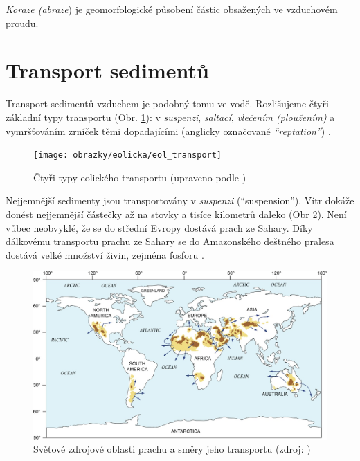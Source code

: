 \emph{Koraze (abraze}) je geomorfologické působení částic obsažených ve vzduchovém proudu.

\section{Transport sedimentů}
Transport sedimentů vzduchem je podobný tomu ve vodě. Rozlišujeme čtyři základní typy transportu (Obr. \ref{fig:eoltransport}): v \emph{suspenzi}, \emph{saltací}, \emph{vlečením (ploužením)} a vymršťováním zrníček těmi dopadajícími (anglicky označované \emph{\enquote{reptation}}) \parencite{livingstoneAeolianGeomorphologyNew2019}. 

\begin{figure}
	\centering
	\texttt{[image: obrazky/eolicka/eol\_transport]}
	\caption{Čtyři typy eolického transportu (upraveno podle \textcite{livingstoneAeolianGeomorphologyNew2019})}
	\label{fig:eoltransport}
\end{figure}


Nejjemnější sedimenty jsou transportovány v \emph{suspenzi} (\enquote{suspension}). Vítr dokáže donést nejjemnější částečky až na stovky a tisíce kilometrů daleko (Obr \ref{fig:zdrojprachu}). Není vůbec neobvyklé, že se do střední Evropy dostává prach ze Sahary. Díky dálkovému transportu prachu ze Sahary se do Amazonského deštného pralesa dostává velké množství živin, zejména fosforu \parencite{prosperoCharacterizingQuantifyingAfrican2020}.

\begin{figure}
	\centering
	\includegraphics[width=1\linewidth]{obrazky/eolicka/zdroje_prachu}
	\caption{Světové zdrojové oblasti prachu a směry jeho transportu (zdroj: \textcite{muhsIdentifyingSourcesAeolian2014})}
	\label{fig:zdrojprachu}
\end{figure}

